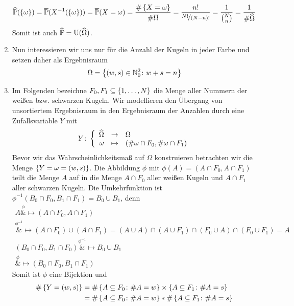 \begin{exercisePage}
\begin{enumerate}[leftmargin=*, label=(\alph*)]
		\begin{equation*}
			\dach\P(\menge{\omega}) = \quer\P(X^{-1}(\menge{\omega})) = \quer{\P} (X = \omega ) = \frac{\# \menge{X = \omega}}{\# \quer\Omega} = \frac{n!}{\lfrac{N!}{(N-n)!}} = \frac{1}{\binom{N}{n}} = \frac{1}{\# \dach{\Omega}}
		\end{equation*}
		Somit ist auch $\widehat{\mathbb{P}} = \operatorname{U}(\widehat{\Omega})$.
		\item Nun interessieren wir uns nur für die Anzahl der Kugeln in jeder Farbe und setzen daher als Ergebnisraum
		\begin{equation*}
			\Omega = \left\{ (w , s) \in \mathbb{N}_0^2 \colon w + s = n \right\}
		\end{equation*} 
		\item Im Folgenden bezeichne $F_0,F_1 \subseteq \left\{ 1, \dots , N \right\}$ die Menge aller Nummern der weißen bzw. schwarzen Kugeln. Wir modellieren den Übergang von unsortiertem Ergebnisraum in den Ergebnisraum der Anzahlen durch eine Zufallsvariable $Y$ mit
		\begin{equation*}
			\bigabb{Y}{\dach\Omega}{\Omega}%
			{\omega}{(\# \omega \cap F_0 , \# \omega \cap F_1)}
		\end{equation*}
		Bevor wir das Wahrscheinlichkeitsmaß auf $\Omega$ konstruieren betrachten wir die Menge $\left\{ Y = \omega = (w , s) \right\}$. Die Abbildung $\phi$ mit $\phi(A) = (A \cap F_0 , A \cap F_1)$ teilt die Menge $A$ auf in die Menge $A \cap F_0$ aller weißen Kugeln und $A \cap F_1$ aller schwarzen Kugeln. Die Umkehrfunktion ist $\phi^{-1} (B_0 \cap F_0 , B_1 \cap F_1) = B_0 \cup B_1$, denn 
		\begin{align*}
			A 
			\overset{\phi}&{\mapsto} (A \cap F_0 , A \cap F_1) \\
			\overset{\phi^{-1}}&{\mapsto} (A \cap F_0) \cup (A \cap F_1) = (A \cup A) \cap (A \cup F_1) \cap (F_0 \cup A) \cap (F_0 \cup F_1) = A  \\
			(B_0 \cap F_0 , B_1 \cap F_0)
			\overset{\phi^{-1}}&{\mapsto} B_0 \cup B_1 \\
			\overset{\phi}&{\mapsto} (B_0 \cap F_0 , B_1 \cap F_1)
		\end{align*}
		Somit ist $\phi$ eine Bijektion und 
		\begin{equation*}
			\begin{aligned}
				\# \menge{Y = (w , s)} 
				&= \# \menge{A \subseteq F_0 \colon \# A = w} \times \menge{A \subseteq F_1 \colon \# A = s} \\
				&= \# \menge{A \subseteq F_0 \colon \# A = w} * \# \menge{A \subseteq F_1 \colon \# A = s}

\end{aligned}
\end{equation*}
\end{enumerate}
\end{exercisePage}

